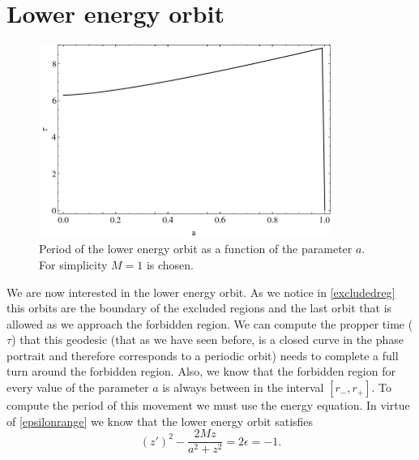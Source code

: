 \section{Lower energy orbit}
 \begin{figure}[b!]
\begin{center}
 \centerline{\includegraphics[width=0.85\textwidth]{img/Chapter3/travel.png}}
 \end{center}
 \caption{Period of the lower energy orbit as a function of the parameter $a$. For simplicity $M=1$ is chosen.}
 \label{fig:travel}
\end{figure}  
We are now interested in the lower energy orbit. As we notice in \cref{excludedreg} this orbits are the boundary of the excluded regions and the last orbit that is allowed as we approach the forbidden region. We can compute the propper time ($\tau$) that this geodesic (that as we have seen before, is a closed curve in the phase portrait and therefore corresponds to a periodic orbit) needs to complete a full turn around the forbidden region. Also, we know that the forbidden region for every value of the parameter $a$ is always between in the interval $[r_-,r_+]$. To compute the period of this movement we must use the energy equation. In virtue of \cref{epsilonrange} we know that the lower energy orbit satisfies
\begin{equation}
 (z')^2-\frac{2 M z}{a^2+z^2}=2 \epsilon=-1.
\end{equation}
